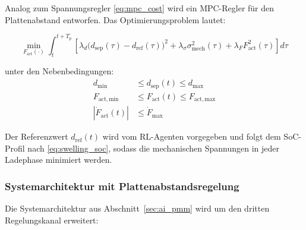 ﻿\documentclass[12pt,a4paper]{article}
\begin{document}
Analog zum Spannungsregler \eqref{eq:mpc_cost} wird ein MPC-Regler für
den Plattenabstand entworfen. Das Optimierungsproblem lautet:

\begin{equation}
	\min_{F_\mathrm{act}(\cdot)} \int_{t}^{t+T_p}
	\left[\lambda_d\bigl(d_\mathrm{sep}(\tau) - d_\mathrm{ref}(\tau)\bigr)^2
	+ \lambda_\sigma \sigma_\mathrm{mech}^2(\tau)
	+ \lambda_F F_\mathrm{act}^2(\tau)\right] d\tau
	\label{eq:mpc_plate_cost}
\end{equation}

unter den Nebenbedingungen:
\begin{align}
	d_\mathrm{min} &\leq d_\mathrm{sep}(t) \leq d_\mathrm{max} \label{eq:plate_constraint_d} \\
	F_\mathrm{act,min} &\leq F_\mathrm{act}(t) \leq F_\mathrm{act,max} \label{eq:plate_constraint_f} \\
	|\dot{F}_\mathrm{act}(t)| &\leq \dot{F}_\mathrm{max} \label{eq:plate_constraint_rate}
\end{align}

Der Referenzwert $d_\mathrm{ref}(t)$ wird vom RL-Agenten vorgegeben und folgt
dem SoC-Profil nach \eqref{eq:swelling_soc}, sodass die mechanischen Spannungen
in jeder Ladephase minimiert werden.

\subsubsection{Systemarchitektur mit Plattenabstandsregelung}

Die Systemarchitektur aus Abschnitt~\ref{sec:ai_pmm} wird um den dritten
Regelungskanal erweitert:
\end{document}
